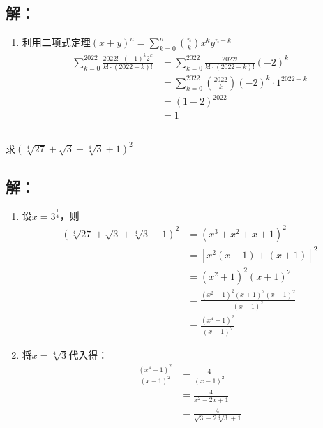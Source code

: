 \subsection*{解：}
\begin{enumerate}
	\item 利用二项式定理$\displaystyle(x+y)^n = \sum_{k=0}^{n}\binom{n}{k}x^ky^{n-k}$
	      \begin{align}
		      \sum_{k=0}^{2022}\frac{2022!\cdot(-1)^k2^k}{k!\cdot(2022-k)!} & = \sum_{k=0}^{2022}\frac{2022!}{k!\cdot
		      (2022-k)!}(-2)^k                                                                                        \\
		                                                                    & =
		      \sum_{k=0}^{2022}\binom{2022}{k}(-2)^k\cdot 1^{2022-k}                                                  \\
		                                                                    & = (1-2)^{2022}                          \\
		                                                                    & = 1
	      \end{align}
\end{enumerate}

\subsection{}
求$(\sqrt[4]{27} + \sqrt{3} + \sqrt[4]{3} + 1)^2$
\subsection*{解：}
\begin{enumerate}
	\item 设$\displaystyle x=3^{\frac{1}{4}}$，则
	      \begin{align}
		      (\sqrt[4]{27} + \sqrt{3} + \sqrt[4]{3} + 1)^2 & = (x^3 + x^2 + x + 1)^2                     \\
		                                                    & = [x^2(x+1) + (x+1)]^2                      \\
		                                                    & = (x^2 + 1)^2(x+1)^2                        \\
		                                                    & = \frac{(x^2 + 1)^2(x+1)^2(x-1)^2}{(x-1)^2} \\
		                                                    & = \frac{(x^4 - 1)^2}{(x-1)^2}
	      \end{align}
	\item 将$x=\sqrt[4]{3}$代入得：
	      \begin{align}
		      \frac{(x^4 - 1)^2}{(x-1)^2} & = \frac{4}{(x-1)^2}                     \\
		                                  & = \frac{4}{x^2 - 2x + 1}                \\
		                                  & = \frac{4}{\sqrt{3} - 2\sqrt[4]{3} + 1}
	      \end{align}
\end{enumerate}
